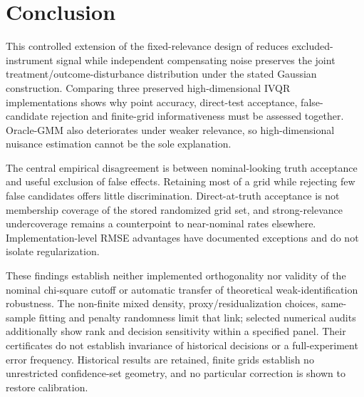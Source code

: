 \section{Conclusion}
This controlled extension of the fixed-relevance design of \textcite{chen_huang_tien_2021} reduces excluded-instrument signal while independent compensating noise preserves the joint treatment/outcome-disturbance distribution under the stated Gaussian construction. Comparing three preserved high-dimensional IVQR implementations shows why point accuracy, direct-test acceptance, false-candidate rejection and finite-grid informativeness must be assessed together. Oracle-GMM also deteriorates under weaker relevance, so high-dimensional nuisance estimation cannot be the sole explanation.

The central empirical disagreement is between nominal-looking truth acceptance and useful exclusion of false effects. Retaining most of a grid while rejecting few false candidates offers little discrimination. Direct-at-truth acceptance is not membership coverage of the stored randomized grid set, and strong-relevance undercoverage remains a counterpoint to near-nominal rates elsewhere. Implementation-level RMSE advantages have documented exceptions and do not isolate regularization.

These findings establish neither implemented orthogonality nor validity of the nominal chi-square cutoff or automatic transfer of theoretical weak-identification robustness. The non-finite mixed density, proxy/residualization choices, same-sample fitting and penalty randomness limit that link; selected numerical audits additionally show rank and decision sensitivity within a specified panel. Their certificates do not establish invariance of historical decisions or a full-experiment error frequency. Historical results are retained, finite grids establish no unrestricted confidence-set geometry, and no particular correction is shown to restore calibration.
